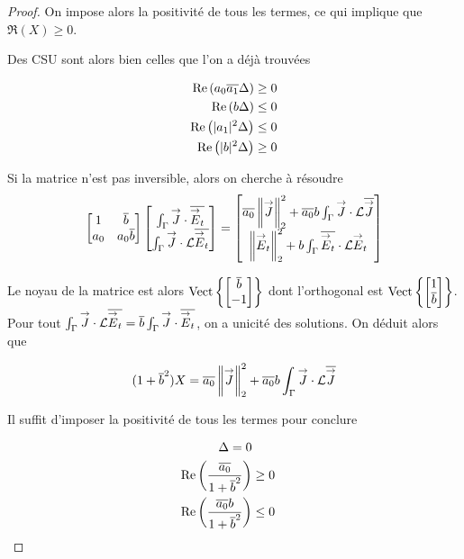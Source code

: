 \begin{proof}
        On impose alors la positivité de tous les termes, ce qui implique que \(\Re(X)\ge0\).

        Des CSU sont alors bien celles que l'on a déjà trouvées

          \begin{align}
          \operatorname{Re}\left(a_0{\overline{a_1}}\Delta\right) &\ge 0\\
          \operatorname{Re}\left(b\Delta\right) &\le 0\\
          \operatorname{Re}\left(|a_1|^2\Delta\right) &\le 0\\
          \operatorname{Re}\left(|b|^2\Delta\right) &\ge 0
        \end{align}

        Si la matrice n'est pas inversible, alors on cherche à résoudre
        \[
          \begin{bmatrix}
            1 & {\overline{b}} \\
            a_0 & a_0{\overline{b}}
          \end{bmatrix}
          \begin{bmatrix}
            \int_\Gamma {\overset{\rightarrow}{J}} \cdot {\overline{{\overset{\rightarrow}{E}}_t}} \\
            \int_\Gamma {\overset{\rightarrow}{J}} \cdot \mathcal{L}{\overline{{\overset{\rightarrow}{E}}_t}}
          \end{bmatrix}
          =
          \begin{bmatrix}
            {\overline{a_0}}\left\lVert {\overset{\rightarrow}{J}} \right\rVert_2^2 + {\overline{a_0}}b\int_\Gamma {\overset{\rightarrow}{J}} \cdot \mathcal{L}{\overline{{\overset{\rightarrow}{J}}}} \\
            \left\lVert {\overset{\rightarrow}{E}}_t \right\rVert_2^2 + b\int_\Gamma {\overline{{\overset{\rightarrow}{E}}_t}} \cdot \mathcal{L}{\overset{\rightarrow}{E}}_t
          \end{bmatrix}
        \]

        Le noyau de la matrice est alors \(\operatorname{Vect}\left\lbrace\begin{bmatrix}{\overline{b}}\\-1\end{bmatrix}\right\rbrace\) dont l'orthogonal est  \(\operatorname{Vect}\left\lbrace\begin{bmatrix}1\\{\overline{b}}\end{bmatrix}\right\rbrace\).
        Pour tout \(\int_\Gamma {\overset{\rightarrow}{J}}\cdot \mathcal{L}{\overline{{\overset{\rightarrow}{E}}_t}} = {\overline{b}} \int_\Gamma {\overset{\rightarrow}{J}} \cdot {\overline{{\overset{\rightarrow}{E}}_t}} \), on a unicité des solutions. On déduit alors que

        \[
          (1 + {\overline{b}}^2) X = {\overline{a_0}} \left\lVert {\overset{\rightarrow}{J}} \right\rVert_2^2 + {\overline{a_0}}b\int_\Gamma {\overset{\rightarrow}{J}} \cdot \mathcal{L}{\overline{{\overset{\rightarrow}{J}}}}
        \]

        Il suffit d'imposer la positivité de tous les termes pour conclure

        \begin{align}
          \Delta = 0 \\
          \operatorname{Re}\left(\dfrac{{\overline{a_0}}}{1 + {\overline{b}}^2}\right) &\ge 0 \\
          \operatorname{Re}\left(\dfrac{{\overline{a_0}}b}{1 + {\overline{b}}^2}\right) &\le 0
        \end{align}

      \end{proof}

